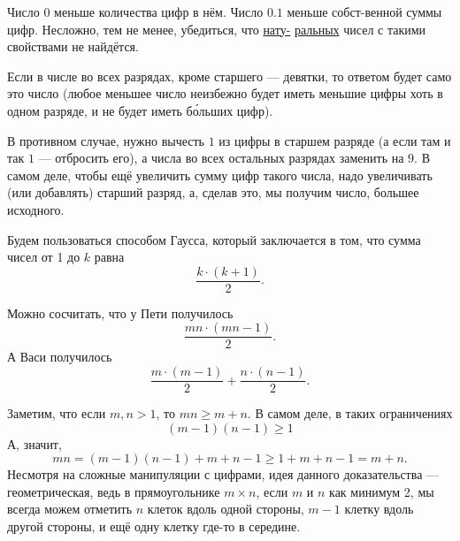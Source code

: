 \begin{itemize}
\itA Число $0$ меньше количества цифр в нём. Число $0.1$ меньше собст-\linebreak венной суммы цифр.
Несложно, тем не менее, убедиться, что \underline{нату-} \underline{ральных} чисел с такими свойствами не найдётся.

\itB Если в числе во всех разрядах, кроме старшего --- девятки, то ответом будет само это число 
(любое меньшее число неизбежно будет иметь меньшие цифры хоть в одном 
разряде, и не будет иметь б\'ольших цифр).

В противном случае, нужно вычесть $1$ из цифры в старшем разряде (а если там и так
$1$ --- отбросить его), а числа во всех остальных разрядах заменить на $9$. 
В самом деле, чтобы ещё увеличить сумму цифр такого числа, надо увеличивать (или добавлять)
старший разряд, а, сделав это, мы получим число, большее исходного.

\itC Будем пользоваться способом Гаусса, который заключается в том,
что сумма чисел от 1 до $k$ равна
$$\frac{k\cdot(k+1)}{2}.$$

Можно сосчитать, что у Пети получилось $$\frac{mn \cdot (mn-1)}{2}.$$
А Васи получилось
$$\frac{m \cdot (m-1)}{2} + \frac{n \cdot (n-1)}{2}.$$

Заметим, что если $m,n > 1$, то $mn \ge m+n$.
В самом деле, в таких ограничениях $$(m-1)(n-1) \ge 1$$ 
А, значит, $$mn = (m-1)(n-1) + m + n - 1 \ge 1 + m + n - 1 = m + n.$$
Несмотря на сложные манипуляции с цифрами, идея данного доказательства --- геометрическая,
ведь в прямоугольнике $m \times n$, если $m$ и $n$ как минимум 2, мы всегда 
можем отметить $n$ клеток вдоль одной стороны,
$m-1$ клетку вдоль другой стороны, и ещё одну клетку где-то в середине.
\begin{center}%
\end{center}



\end{itemize}
